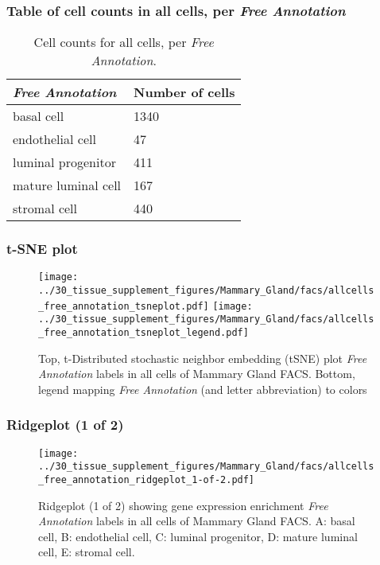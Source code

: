 \subsubsection{Table of cell counts in all cells, per \emph{Free Annotation}}\begin{table}[h]
\centering
\label{my-label}
\begin{tabular}{@{}ll@{}}
\toprule

\emph{Free Annotation}& Number of cells \\ \midrule
basal cell & 1340 \\

endothelial cell & 47 \\

luminal progenitor & 411 \\

mature luminal cell & 167 \\

stromal cell & 440 \\
\bottomrule
\end{tabular}
\caption{Cell counts for all cells, per \emph{Free Annotation}.}
\end{table}

\clearpage
\subsubsection{t-SNE plot}
\begin{figure}[h]
\centering
\texttt{[image: ../30\_tissue\_supplement\_figures/Mammary\_Gland/facs/allcells\_free\_annotation\_tsneplot.pdf]}
\texttt{[image: ../30\_tissue\_supplement\_figures/Mammary\_Gland/facs/allcells\_free\_annotation\_tsneplot\_legend.pdf]}
\caption{Top, t-Distributed stochastic neighbor embedding (tSNE) plot  \emph{Free Annotation} labels in all cells of Mammary Gland FACS. Bottom, legend mapping \emph{Free Annotation} (and letter abbreviation) to colors}
\end{figure}


\clearpage

\subsubsection{Ridgeplot (1 of 2)}
\begin{figure}[h]
\centering
\texttt{[image: ../30\_tissue\_supplement\_figures/Mammary\_Gland/facs/allcells\_free\_annotation\_ridgeplot\_1-of-2.pdf]}

\caption{ Ridgeplot (1 of 2)  showing gene expression enrichment \emph{Free Annotation} labels in all cells of Mammary Gland FACS. A: basal cell, B: endothelial cell, C: luminal progenitor, D: mature luminal cell, E: stromal cell.}
\end{figure}


